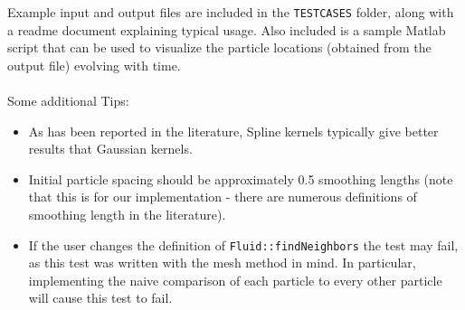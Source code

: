 \documentclass[12pt]{article}
\begin{document}
Example input and output files are included in the \texttt{TESTCASES} folder, along with a readme document explaining typical usage. Also included is a sample Matlab script that can be used to visualize the particle locations (obtained from the output file) evolving with time.
\\
\\
Some additional Tips:
\begin{itemize}
\item As has been reported in the literature, Spline kernels typically give better results that Gaussian kernels.
\item Initial particle spacing should be approximately 0.5 smoothing lengths (note that this is for our implementation - there are numerous definitions of smoothing length in the literature).
\item If the user changes the definition of \texttt{Fluid::findNeighbors} the test may fail, as this test was written with the mesh method in mind. In particular, implementing the naive comparison of each particle to every other particle will cause this test to fail.
\end{itemize}


\end{document}
